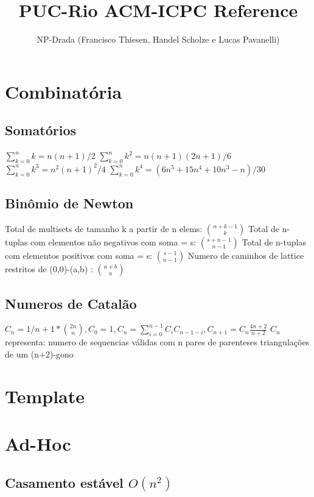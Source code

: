 \documentclass[10pt, letterpaper, twocolumn, twosides]{article}
\begin{document}
\title{PUC-Rio ACM-ICPC Reference}
\author{NP-Drada (Francisco Thiesen, Handel Scholze e Lucas Pavanelli)}
\maketitle
\tableofcontents
{}
\section{Combinatória}
\subsection{Somatórios}
${\sum_{k=0}^{n}k  = n(n+1)/2}$\newline
${\sum_{k=0}^{n}k^2 = n(n+1)(2n + 1)/6}$\newline
${\sum_{k=0}^{n}k^3 = n^2(n+1)^2/4}$\newline
${\sum_{k=0}^{n}k^4 = (6n^5 + 15n^4 + 10n^3 - n)/30}$
\subsection{Binômio de Newton}
Total de multisets de tamanho k a partir de n elems: ${\binom{n+k-1}{k}}$\newline
Total de n-tuplas com elementos não negativos com soma = s: ${\binom{s+n-1}{n-1}}$\newline
Total de n-tuplas com elementos positivos com soma = s: ${\binom{s-1}{n-1}}$\newline
Numero de caminhos de lattice restritos de (0,0)-(a,b) : ${\binom{a+b}{a}}$
\subsection{Numeros de Catalão}
${C_n = 1/n+1 * \binom{2n}{n}, C_0 = 1, C_n = \sum_{i=0}^{n-1}C_iC_{n-1-i}, C_{n+1} = C_n\frac{4n+2}{n+2}}$
${C_n}$ representa: numero de sequencias válidas com n pares de parenteses\newline
triangulações de um (n+2)-gono

\section{Template}


\section{Ad-Hoc}
\subsection{Casamento estável ${O(n^2)}$}

\end{document}
